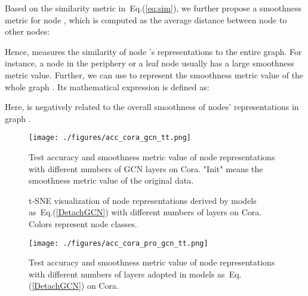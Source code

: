 \documentclass[sigconf]{acmart}
\begin{document}
Based on the similarity metric in~Eq.(\ref{eq:sim}), we further
propose a smoothness metric  for node , which is
computed as the average distance between node  to other nodes:

Hence,  measures the similarity of node 's
representations to the entire graph. For instance, a node in the
periphery or a leaf node usually has a large smoothness metric
value. Further, we can use  to represent the smoothness
metric value of the whole graph . Its mathematical expression
is defined as:

Here,  is negatively related to the overall smoothness of
nodes' representations in graph .

\begin{figure}[t]
\centering
\texttt{[image: ./figures/acc\_cora\_gcn\_tt.png]}
\caption{Test accuracy and smoothness metric value of node representations with different numbers of GCN layers on Cora. "Init" means the smoothness metric value of the original data.}
\label{fig:gcn_degrade}
\end{figure}







\begin{figure*}
\centering
{}

\caption{t-SNE visualization of node representations derived by models as~Eq.(\ref{DetachGCN}) with different numbers of layers on Cora. Colors represent node classes.}
\label{fig:tsne2}
\end{figure*}

\begin{figure}
\centering
\texttt{[image: ./figures/acc\_cora\_pro\_gcn\_tt.png]}
\caption{Test accuracy and smoothness metric value of node representations with different numbers of layers adopted in models as~Eq.(\ref{DetachGCN}) on Cora.}
\label{fig:detachgcn}
\end{figure}
\end{document}
